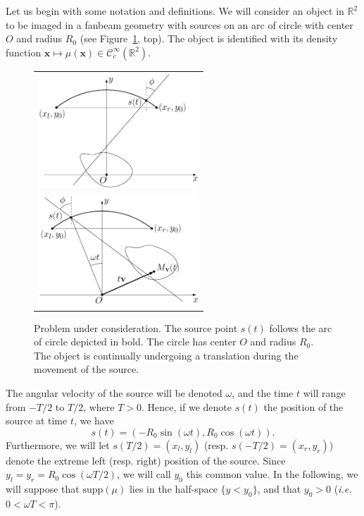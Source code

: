 \documentclass[twocolumn]{IEEEtran}
\newcommand{\R}{\mathbb{R}}
\newcommand{\ie}{\emph{i.e.} }
\newcommand{\Ccinf}{\mathcal{C}_c^{\infty}}
\newcommand{\supp}{\textrm{supp}}
\begin{document}
Let us begin with some notation and definitions. We will consider an object in $\R^2$ to be imaged in a fanbeam geometry with sources on an arc of circle with center $O$ and radius $R_0$ (see Figure~\ref{fig:notations}, top). The object is identified with its density function $\mathbf{x} \mapsto \mu(\mathbf{x}) \in \Ccinf(\R^2)$.
\begin{figure}[!ht]
	\centering
	\begin{tabular}{c}
	\includegraphics[width=60mm]{figs/frame_scanner_still.eps} \\
	\includegraphics[width=60mm]{figs/frame_scanner.eps}
	\end{tabular}
	\caption{Problem under consideration. The source point $s(t)$ follows the arc of circle depicted in bold. The circle has center $O$ and radius $R_0$. The object is continually undergoing a translation during the movement of the source.\label{fig:notations}}
\end{figure}
The angular velocity of the source will be denoted $\omega$, and the time $t$ will range from $-T/2$ to $T/2$, where $T>0$. Hence, if we denote $s(t)$ the position of the source at time $t$, we have
\begin{equation}
	s(t) = \left( -R_0 \sin(\omega t), R_0 \cos(\omega t) \right).
\label{eq:source_position}
\end{equation}
Furthermore, we will let $s(T/2)=(x_l,y_l)$ (resp. $s(-T/2)=(x_r,y_r)$) denote the extreme left (resp. right) position of the source. Since $y_l = y_r = R_0 \cos(\omega T/2)$, we will call $y_0$ this common value. In the following, we will suppose that $\supp(\mu)$ lies in the half-space $\{ y < y_0 \}$, and that $y_0 > 0$ (\ie $0 < \omega T < \pi$).
\end{document}
